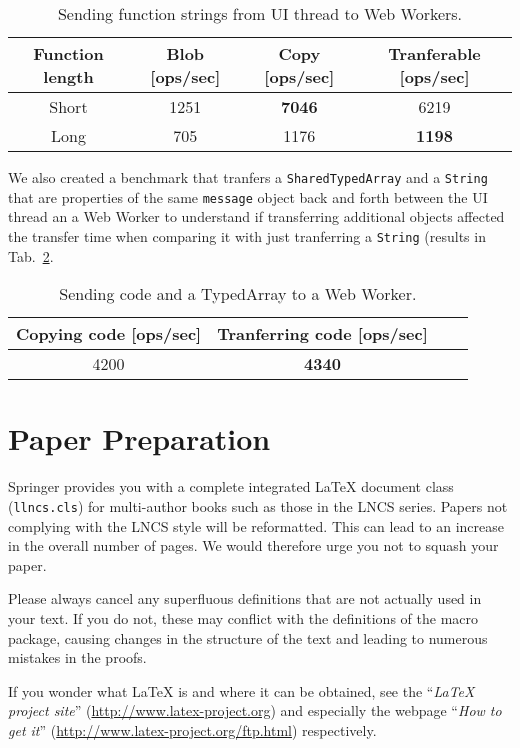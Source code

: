 \documentclass[runningheads,a4paper]{llncs}
\begin{document}
\begin{table}
  \centering
  \begin{tabular}{|c|c|c|c|}
    \hline
    Function length & Blob [ops/sec] & Copy [ops/sec] & Tranferable [ops/sec] \\
    \hline
    Short & 1251 & \textbf{7046} & 6219 \\
    Long & 705 & 1176 & \textbf{1198} \\
    \hline
  \end{tabular}
  \caption{Sending function strings from UI thread to Web Workers.}
  \label{tab:send-function}
\end{table}

We also created a benchmark that tranfers a \verb+SharedTypedArray+ and a \verb+String+ that are properties of the same \verb+message+ object back and forth between the UI thread an a Web Worker to understand if transferring additional objects affected the transfer time when comparing it with just tranferring a \verb+String+ (results in Tab.~\ref{tab:send-function-and-array}.
\begin{table}
  \centering
  \begin{tabular}{|c|c|c|c|}
    \hline
    Copying code [ops/sec] & Tranferring code [ops/sec] \\
    \hline
    4200 & \textbf{4340} \\
    \hline
  \end{tabular}
  \caption{Sending code and a TypedArray to a Web Worker.}
  \label{tab:send-function-and-array}
\end{table}

\section{Paper Preparation}

Springer provides you with a complete integrated \LaTeX{} document class
(\texttt{llncs.cls}) for multi-author books such as those in the LNCS
series. Papers not complying with the LNCS style will be reformatted.
This can lead to an increase in the overall number of pages. We would
therefore urge you not to squash your paper.

Please always cancel any superfluous definitions that are
not actually used in your text. If you do not, these may conflict with
the definitions of the macro package, causing changes in the structure
of the text and leading to numerous mistakes in the proofs.

If you wonder what \LaTeX{} is and where it can be obtained, see the
``\textit{LaTeX project site}'' (\url{http://www.latex-project.org})
and especially the webpage ``\textit{How to get it}''
(\url{http://www.latex-project.org/ftp.html}) respectively.
\end{document}
